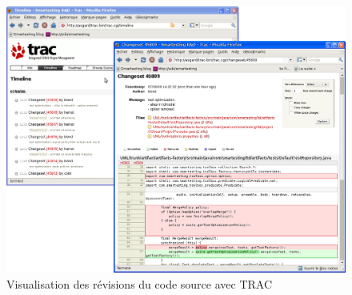 \begin{figure}[!ht]
\centering
\includegraphics[width=\textwidth]{Illustrations/trac.png}
\caption{Visualisation des révisions du code source avec TRAC}
\label{figure:trac}
\end{figure}
